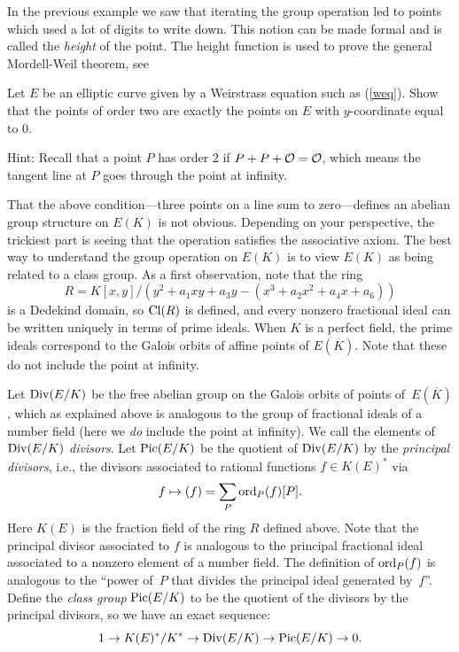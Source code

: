 \begin{remark}
In the previous example we saw that iterating the
group operation led to points which used a lot of digits
to write down. This notion can be made formal and is called
the \emph{height} of the point. The height function is used
to prove the general Mordell-Weil theorem, see
\cite[Ch. VIII.4]{silverman:aec}
\end{remark}

\begin{exercise}\label{ex:ec2torsion}
	Let $E$ be an elliptic curve given by a
	Weirstrass equation such as (\ref{weq}).
	Show that the points of order two are exactly
	the points on $E$ with $y$-coordinate equal to
	$0$.

	Hint: Recall that a point $P$ has order $2$ if
	$P + P + \mathcal{O} = \mathcal{O}$, which means the tangent line
	at $P$ goes through the point at infinity.
\end{exercise}

That the above condition---three points on a line sum to
zero---defines an abelian group structure on $E(K)$ is not obvious.
Depending on your perspective, the trickiest part is seeing that the
operation satisfies the associative axiom.  The best way to understand
the group operation on $E(K)$ is to view $E(K)$ as being related to a
class group.  As a first observation, note that the ring
$$
 R = K[x,y]/(y^2 +a_1 xy + a_3 y - (x^3 + a_2 x^2 + a_4 x + a_6))
$$
is a Dedekind domain, so $\operatorname{Cl}(R)$ is defined, and every nonzero
fractional ideal can be written uniquely in terms of prime ideals.
When $K$ is a perfect field, the prime ideals correspond to the Galois
orbits of affine points of $E(\overline{K})$.
Note that these do not include the point at infinity.

Let $\operatorname{Div}(E/K)$ be the free abelian group on the Galois orbits of
points of~$E(\overline{K})$, which as explained above is analogous to
the group of fractional ideals of a number field (here we {\em do}
include the point at infinity).
We call the elements of $\operatorname{Div}(E/K)$
{\em divisors}.  Let $\operatorname{Pic}(E/K)$ be the quotient of $\operatorname{Div}(E/K)$ by the
\emph{principal divisors}, i.e., the divisors associated to rational functions
$f\in K(E)^*$ via
$$
 f \mapsto (f) = \sum_{P} \operatorname{ord}_P(f) [P].
$$
Here $K(E)$ is the fraction field of the ring $R$ defined above.
Note that the principal divisor associated to $f$ is analogous to the
principal fractional ideal associated to a nonzero element of a number
field.  The definition of $\operatorname{ord}_P(f)$ is analogous to the ``power
of~$P$ that divides the principal ideal generated by~$f$''.
Define the \emph{class group} $\operatorname{Pic}(E/K)$ to be the quotient of the
divisors by the principal divisors, so we have
an exact sequence:
$$
  1\to K(E)^*/K^* \to \operatorname{Div}(E/K) \to \operatorname{Pic}(E/K) \to 0.
$$


